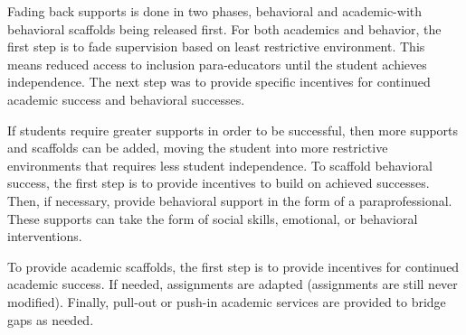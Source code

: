 \documentclass[twoside]{article}
\begin{document}
Fading back supports is done in two phases, behavioral and academic-with behavioral scaffolds being released first. For both academics and behavior, the first step is to fade supervision based on least restrictive environment. This means reduced access to inclusion para-educators until the student achieves independence. The next step was to provide specific incentives for continued academic success and behavioral successes. 

If students require greater supports in order to be successful, then more supports and scaffolds can be added, moving the student into more restrictive environments that requires less student independence. To scaffold behavioral success, the first step is to provide incentives to build on achieved successes. Then, if necessary, provide behavioral support in the form of a paraprofessional. These supports can take the form of social skills, emotional, or behavioral interventions. 

To provide academic scaffolds, the first step is to provide incentives for continued academic success. If needed, assignments are adapted (assignments are still never modified). Finally, pull-out or push-in academic services are provided to bridge gaps as needed.
\end{document}
